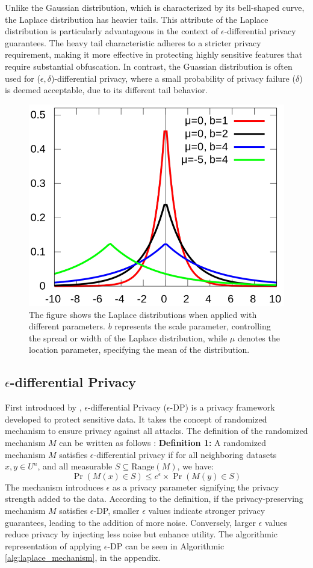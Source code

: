 \documentclass{l4proj}
\begin{document}
Unlike the Gaussian distribution, which is characterized by its bell-shaped curve, the Laplace distribution has heavier tails. This attribute of the Laplace distribution is particularly advantageous in the context of $\epsilon$-differential privacy guarantees. The heavy tail characteristic adheres to a stricter privacy requirement, making it more effective in protecting highly sensitive features that require substantial obfuscation. In contrast, the Guassian distribution is often used for ($\epsilon,\delta$)-differential privacy, where a small probability of privacy failure ($\delta$) is deemed acceptable, due to its different tail behavior.

\begin{figure}[h]
    \centering
    \includegraphics[width=0.33\linewidth]{images/laplace-distribution.png}
    \caption{The figure shows the Laplace distributions when applied with different parameters. $b$ represents the scale parameter, controlling the spread or width of the Laplace distribution, while $\mu$ denotes the location parameter, specifying the mean of the distribution.}
    \label{fig:laplace-distribution}
\end{figure}

\subsection{$\epsilon$-differential Privacy} \label{epsilon_dp}
First introduced by \cite{differential_privacy}, $\epsilon$-differential Privacy ($\epsilon$-DP) is a privacy framework developed to protect sensitive data. It takes the concept of randomized mechanism to ensure privacy against all attacks. The definition of the randomized mechanism $M$ can be written as follows \citep{bootstrap_dp}:
\vspace{0.1cm}
\newline
\textbf{Definition 1:} A randomized mechanism $M$ satisfies $\epsilon$-differential privacy if for all neighboring datasets $x, y \in U^n$, and all measurable $S \subseteq \text{Range}(M)$, we
have:
\begin{equation}
    \Pr(M(x) \in S) \leq e^{\epsilon} \times \Pr(M(y) \in S)
    \label{eq:randomized-M_dp}
\end{equation}
The mechanism introduces $\epsilon$ as a privacy parameter signifying the privacy strength added to the data. According to the definition, if the privacy-preserving mechanism $M$ satisfies $\epsilon$-DP, smaller $\epsilon$ values indicate stronger privacy guarantees, leading to the addition of more noise. Conversely, larger $\epsilon$ values reduce privacy by injecting less noise but enhance utility. The algorithmic representation of applying $\epsilon$-DP can be seen in Algorithmic \ref{alg:laplace_mechanism}, in the appendix. 
\end{document}
